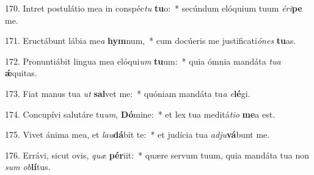 170. Intret postulátio mea in conspéc\textit{tu} \textbf{tu}o:~*  secúndum elóquium tuum \textit{é}\textit{ri}\textbf{pe} me.\

171. Eructábunt lábia me\textit{a} \textbf{hym}num,~*  cum docúeris me justificati\textit{ó}\textit{nes} \textbf{tu}as.\

172. Pronuntiábit lingua mea elóqui\textit{um} \textbf{tu}um:~*  quia ómnia mandáta \textit{tu}\textit{a} \textbf{ǽ}quitas.\

173. Fiat manus tua \textit{ut} \textbf{sal}vet me:~*  quóniam mandáta tu\textit{a} \textit{e}\textbf{lé}gi.\

174. Concupívi salutáre tu\textit{um}, \textbf{Dó}mine:~*  et lex tua meditá\textit{ti}\textit{o} \textbf{me}a est.\

175. Vivet ánima mea, et \textit{lau}\textbf{dá}bit te:~*  et judícia tua \textit{ad}\textit{ju}\textbf{vá}bunt me.\

176. Errávi, sicut ovis, \textit{quæ} \textbf{pér}iit:~*  quære servum tuum, quia mandáta tua non \textit{sum} \textit{ob}\textbf{lí}tus.\

